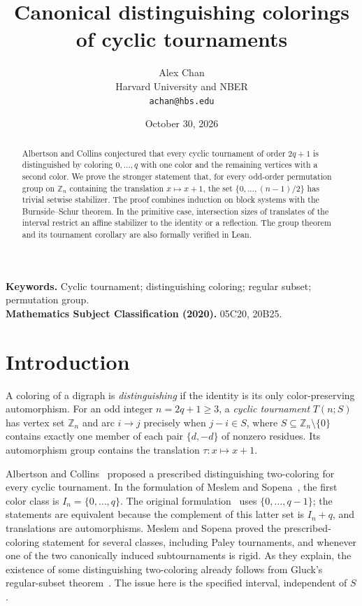 \documentclass[11pt]{article}
\title{Canonical distinguishing colorings of cyclic tournaments}
\author{Alex Chan\\
\small Harvard University and NBER\\
\small \texttt{achan@hbs.edu}}
\date{October 30, 2026}
\newcommand{\Z}{\mathbb Z}
\begin{document}
\maketitle
\begin{abstract}
Albertson and Collins conjectured that every cyclic tournament of order
$2q+1$ is distinguished by coloring $0,\ldots,q$ with one color and the
remaining vertices with a second color. We prove the stronger statement
that, for every odd-order permutation group on $\Z_n$ containing the
translation $x\mapsto x+1$, the set $\{0,\ldots,(n-1)/2\}$ has trivial
setwise stabilizer. The proof combines induction on block systems with
the Burnside--Schur theorem. In the primitive case, intersection sizes
of translates of the interval restrict an affine stabilizer to the
identity or a reflection. The group theorem and its tournament
corollary are also formally verified in Lean.
\end{abstract}
\noindent\textbf{Keywords.} Cyclic tournament; distinguishing coloring;
regular subset; permutation group.\\
\textbf{Mathematics Subject Classification (2020).} 05C20, 20B25.

\section{Introduction}
A coloring of a digraph is \emph{distinguishing} if the identity is its
only color-preserving automorphism. For an odd integer $n=2q+1\geq3$,
a \emph{cyclic tournament} $T(n;S)$ has vertex set $\Z_n$ and arc
$i\to j$ precisely when $j-i\in S$, where $S\subseteq\Z_n\setminus\{0\}$
contains exactly one member of each pair $\{d,-d\}$ of nonzero residues.
Its automorphism group contains the translation $\tau:x\mapsto x+1$.

Albertson and Collins~\cite{AC} proposed a prescribed distinguishing
two-coloring for every cyclic tournament. In the formulation of
Meslem and Sopena~\cite[Conjecture 2]{MS}, the first color class is
$I_n=\{0,\ldots,q\}$. The original formulation~\cite[Conjecture 2.4]{AC}
uses $\{0,\ldots,q-1\}$; the statements are equivalent because the
complement of this latter set is $I_n+q$, and translations are
automorphisms. Meslem and Sopena proved the prescribed-coloring
statement for several classes, including Paley tournaments, and whenever
one of the two canonically induced subtournaments is rigid.
As they explain, the existence of some distinguishing two-coloring
already follows from Gluck's regular-subset theorem~\cite{Gluck}.
The issue here is the specified interval, independent of $S$.
\end{document}
